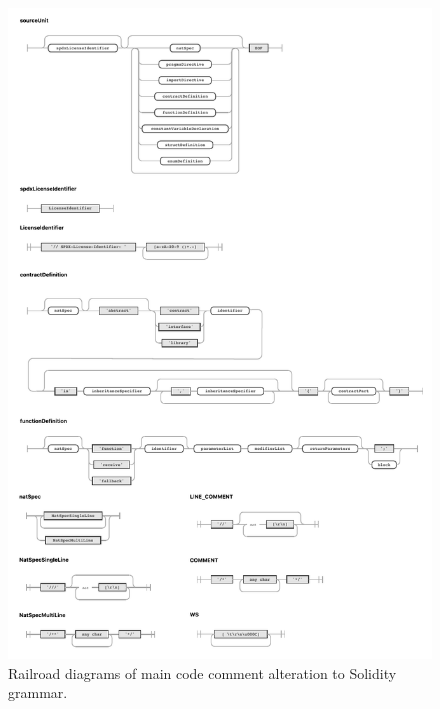 \begin{figure}[htbp]
    \centering
    \includegraphics[width=\textwidth]{figures/solidity-comments-railroad-diagram.pdf}
    \caption{Railroad diagrams of main code comment alteration to Solidity grammar.}
    \label{fig:solidity-railroad-diagram}
\end{figure}


